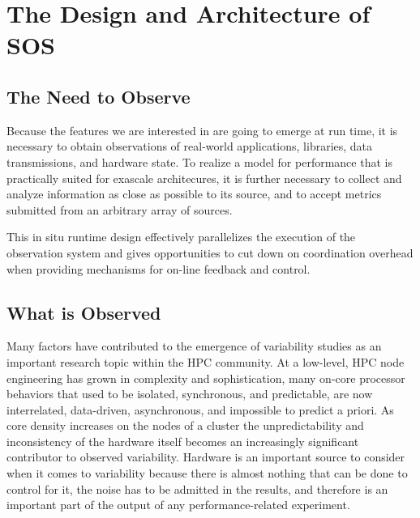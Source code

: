 
\section{The Design and Architecture of SOS}

\subsection{The Need to Observe}
Because the features we are interested in are going to emerge at run
time, it is necessary to obtain observations of real-world
applications, libraries, data transmissions, and hardware state. To
realize a model for performance that is practically suited for
exascale architecures, it is further necessary to collect and analyze
information as close as possible to its source, and to accept metrics
submitted from an arbitrary array of sources.

This in situ runtime design
effectively parallelizes the execution of the observation
system and gives opportunities to cut down on coordination
overhead when providing mechanisms for on-line feedback and control.



\subsection{What is Observed}

Many factors have contributed to the emergence of variability studies
as an important research topic within the HPC community. At a
low-level, HPC node engineering has grown in complexity and
sophistication, many on-core processor behaviors that used to be
isolated, synchronous, and predictable, are now interrelated,
data-driven, asynchronous, and impossible to predict a priori. As core
density increases on the nodes of a cluster the unpredictability and
inconsistency of the hardware itself becomes an increasingly
significant contributor to observed variability. Hardware is an
important source to consider when it comes to variability because
there is almost nothing that can be done to control for it, the noise
has to be admitted in the results, and therefore is an important part
of the output of any performance-related experiment.

